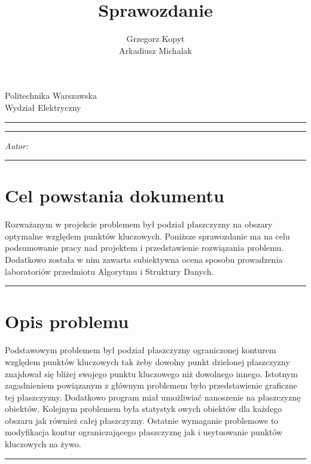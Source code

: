 \documentclass[a4paper,11pt]{article}
\author{Grzegorz Kopyt\\Arkadiusz Michalak}
\title{Sprawozdanie}
\makeatletter
\newcommand{\linia}{\rule{\linewidth}{0.4mm}}
\renewcommand{\maketitle}{\begin{titlepage}
    \vspace*{2cm}
    \begin{center}\LARGE
    Politechnika Warszawska\\
    Wydział Elektryczny\\
    \end{center}
    \vspace{5cm}
    \noindent\linia
    \begin{center}
      \LARGE \textsc{\@title}
         \end{center}
     \linia
    \vspace{0.5cm}
    \begin{flushright}
    \begin{minipage}{5cm}
    \textit{Autor:}\\
    \normalsize \textsc{\@author} \par
    \end{minipage}
    \vspace{5cm}
     \end{flushright}
    \vspace*{\stretch{6}}
    \begin{center}
    \@date
    \end{center}
  \end{titlepage}
}
\makeatother
\begin{document}
\maketitle

\tableofcontents
\vspace{1cm}
\noindent\linia
\section{Cel powstania dokumentu}
Rozważanym w projekcie problemem był podział płaszczyzny na obszary optymalne względem punktów kluczowych. Poniższe sprawozdanie ma na celu podsumowanie pracy nad projektem i przedstawienie rozwiązania problemu. Dodatkowo została w nim zawarta subiektywna ocena sposobu prowadzenia laboratoriów przedmiotu Algorytmu i Struktury Danych.

\noindent\linia
\section{Opis problemu}
Podstawowym problemem był podział płaszczyzny ograniczonej konturem względem punktów kluczowych tak żeby dowolny punkt dzielonej płaszczyzny znajdował się bliżej swojego punktu kluczowego niż dowolnego innego. Istotnym zagadnieniem powiązanym z głównym problemem było przedstawienie graficzne tej płaszczyzny. Dodatkowo program miał umożliwiać nanoszenie na płaszczyznę obiektów. Kolejnym problemem była statystyk owych obiektów dla każdego obszaru jak również całej płaszczyzny. Ostatnie wymaganie problemowe to modyfikacja kontur ograniczającego płaszczyznę jak i usytuowanie punktów kluczowych na żywo. 

\noindent\linia
\end{document}
